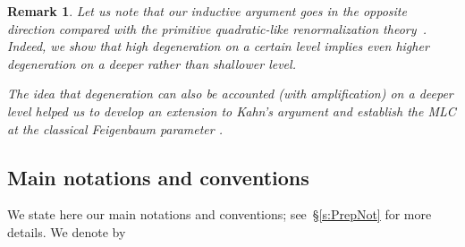 \documentclass{amsart}
\newcommand{\1}{{\mathbb 1 }}
\newtheorem{rem}[thm]{Remark}
\theoremstyle{remark}
\numberwithin{equation}{section}
\theoremstyle{definition}
\begin{document}
\begin{rem}
\label{remark: going deep}
Let us note that our inductive argument goes in the opposite direction compared with the primitive quadratic-like renormalization theory~\cite{K,KL2}. Indeed, we show that high degeneration on a certain level implies even higher degeneration on a deeper rather than shallower level.

The idea that degeneration can also be accounted (with amplification) on a deeper level helped us to develop an extension to Kahn's argument \cite{K} and establish the MLC at the classical Feigenbaum parameter \cite{DL:Feigen}.
\end{rem}


 


 

\subsection{Main notations and conventions}
We state here our main notations and conventions; see~\S\ref{s:PrepNot} for more details. We denote by
\end{document}
